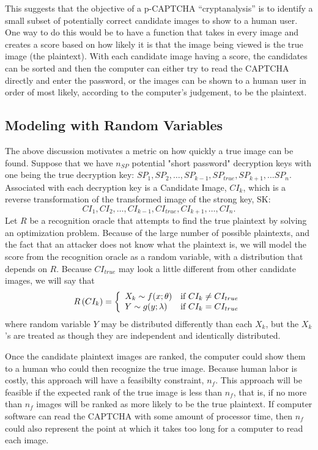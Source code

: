 \documentclass[12pt]{article}
\begin{document}
{This suggests that the objective of a p-CAPTCHA “cryptanalysis” is to identify a small subset of potentially correct candidate images to show to a human user. One way to do this would be to have a function that takes in every image and creates a score based on how likely it is that the image being viewed is the true image (the plaintext). With each candidate image having a score, the candidates can be sorted and then the computer can either try to read the CAPTCHA directly and enter the password, or the images can be shown to a human user in order of most likely, according to the computer's judgement, to be the plaintext.

\subsection*{Modeling with Random Variables}
The above discussion motivates a metric on how quickly a true image can be found. Suppose that we have $n_{SP}$ potential "short password" decryption keys with one being the true decryption key: 
$SP_1, SP_2, \ldots, SP_{k-1}, SP_{true}, SP_{k+1}, \ldots SP_n$.
Associated with each decryption key is a Candidate Image, $CI_k$, which is a reverse transformation of the transformed image of the strong key, SK:
$$CI_1, CI_2, \ldots, CI_{k-1}, CI_{true}, CI_{k+1}, \ldots, CI_n.$$
Let $R$ be a recognition oracle that attempts to find the true plaintext by solving an optimization problem. Because of the large number of possible plaintexts, and the fact that an attacker does not know what the plaintext is, we will model the score from the recognition oracle as a random variable, with a distribution that depends on $R$. Because $CI_{true}$ may look a little different from other candidate images, we will say that
\begin{displaymath}
   R\left(CI_k\right) = \left\{
     \begin{array}{lr}
       X_k \sim f(x; \mathbf{\theta}) & \hbox{if } CI_k \neq CI_{true}\\
       Y \sim g(y; \mathbf{\lambda}) & \hbox{if } CI_k = CI_{true}
     \end{array}
   \right.
\end{displaymath}
where random variable $Y$ may be distributed differently than each $X_k$, but the $X_k$'s are treated as though they are independent and identically distributed.

Once the candidate plaintext images are ranked, the computer could show them to a human who could then recognize the true image. Because human labor is costly, this approach will have a feasibilty constraint, $n_f$. This approach will be feasible if the expected rank of the true image is less than $n_f$, that is, if no more than $n_f$ images will be ranked as more likely to be the true plaintext. If computer software can read the CAPTCHA with some amount of processor time, then $n_f$ could also represent the point at which it takes too long for a computer to read each image.

}
\end{document}
